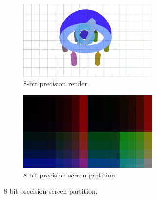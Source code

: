 \documentclass[conference]{IEEEtran}
\begin{document}
\begin{figure}[htbp]
\centering
\begin{subfigure}{1.1\textwidth}
\begin{center}
\begin{minipage}[t]{\linewidth}
\hspace{-0.09\linewidth}
  \centering
    \begin{subfigure}{.49\textwidth}
      \centering
      \includegraphics[width=\linewidth]{8_render.jpg}
      \caption{8-bit precision render.}
      \label{fig:render_8}
    \end{subfigure}
    \begin{subfigure}{.49\textwidth}
      \centering
      \includegraphics[width=\linewidth]{8_partition.jpg}
      \caption{8-bit precision screen partition.}
      \label{fig:render_8}
    \end{subfigure}
  \label{fig:render_8}
\end{minipage}
\end{center}
\end{subfigure}
\par\medskip
\begin{subfigure}{1.1\textwidth}

\end{subfigure}
\end{figure}
\end{document}
